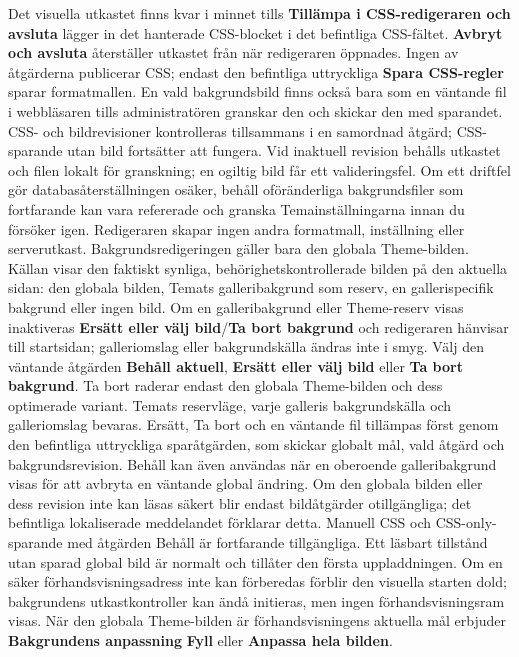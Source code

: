 \documentclass[11pt,a4paper]{article}
\newcommand{\ui}[1]{\textbf{#1}}
\begin{document}
Det visuella utkastet finns kvar i minnet tills \ui{Tillämpa i CSS-redigeraren
och avsluta} lägger in det hanterade CSS-blocket i det befintliga CSS-fältet.
\ui{Avbryt och avsluta} återställer utkastet från när redigeraren öppnades.
Ingen av åtgärderna publicerar CSS; endast den befintliga uttryckliga \ui{Spara
CSS-regler} sparar formatmallen. En vald bakgrundsbild finns också bara som en
väntande fil i webbläsaren tills administratören granskar den och skickar den
med sparandet. CSS- och bildrevisioner kontrolleras tillsammans i en samordnad
åtgärd; CSS-sparande utan bild fortsätter att fungera. Vid inaktuell revision
behålls utkastet och filen lokalt för granskning; en ogiltig bild får ett
valideringsfel. Om ett driftfel gör databasåterställningen osäker, behåll
oföränderliga bakgrundsfiler som fortfarande kan vara refererade och granska
Temainställningarna innan du försöker igen. Redigeraren skapar ingen andra
formatmall, inställning eller serverutkast.
Bakgrundsredigeringen gäller bara den globala Theme-bilden. Källan visar den
faktiskt synliga, behörighetskontrollerade bilden på den aktuella sidan: den
globala bilden, Temats galleribakgrund som reserv, en gallerispecifik bakgrund
eller ingen bild. Om en galleribakgrund eller Theme-reserv visas inaktiveras
\ui{Ersätt eller välj bild}/\ui{Ta bort bakgrund} och redigeraren hänvisar till
startsidan; galleriomslag eller bakgrundskälla ändras inte i smyg. Välj den
väntande åtgärden \ui{Behåll aktuell}, \ui{Ersätt eller välj bild} eller \ui{Ta
bort bakgrund}. Ta bort raderar endast den globala Theme-bilden och dess
optimerade variant. Temats reservläge, varje galleris bakgrundskälla och
galleriomslag bevaras. Ersätt, Ta bort och en väntande fil tillämpas först genom
den befintliga uttryckliga sparåtgärden, som skickar globalt mål, vald åtgärd
och bakgrundsrevision. Behåll kan även användas när en oberoende galleribakgrund
visas för att avbryta en väntande global ändring.
Om den globala bilden eller dess revision inte kan läsas säkert blir endast
bildåtgärder otillgängliga; det befintliga lokaliserade meddelandet förklarar
detta. Manuell CSS och CSS-only-sparande med åtgärden Behåll är fortfarande
tillgängliga. Ett läsbart tillstånd utan sparad global bild är normalt och
tillåter den första uppladdningen. Om en säker förhandsvisningsadress inte kan
förberedas förblir den visuella starten dold; bakgrundens utkastkontroller kan
ändå initieras, men ingen förhandsvisningsram visas.
När den globala Theme-bilden är förhandsvisningens aktuella mål erbjuder
\ui{Bakgrundens anpassning} \ui{Fyll} eller \ui{Anpassa hela bilden}.
\end{document}

